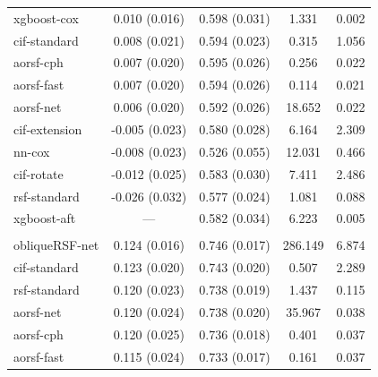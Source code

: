\documentclass{article}\usepackage[]{graphicx}\usepackage[]{xcolor}
\newenvironment{knitrout}{}{} %
\begin{document}
\begin{knitrout}
\begin{longtable}[t]{lcccc}
\hspace{1em}xgboost-cox & 0.010 (0.016) & 0.598 (0.031) & 1.331 & 0.002\\
\hspace{1em}cif-standard & 0.008 (0.021) & 0.594 (0.023) & 0.315 & 1.056\\
\hspace{1em}aorsf-cph & 0.007 (0.020) & 0.595 (0.026) & 0.256 & 0.022\\
\hspace{1em}aorsf-fast & 0.007 (0.020) & 0.594 (0.026) & 0.114 & 0.021\\
\hspace{1em}aorsf-net & 0.006 (0.020) & 0.592 (0.026) & 18.652 & 0.022\\
\hspace{1em}cif-extension & -0.005 (0.023) & 0.580 (0.028) & 6.164 & 2.309\\
\hspace{1em}nn-cox & -0.008 (0.023) & 0.526 (0.055) & 12.031 & 0.466\\
\hspace{1em}cif-rotate & -0.012 (0.025) & 0.583 (0.030) & 7.411 & 2.486\\
\hspace{1em}rsf-standard & -0.026 (0.032) & 0.577 (0.024) & 1.081 & 0.088\\
\hspace{1em}xgboost-aft & --- & 0.582 (0.034) & 6.223 & 0.005\\
\addlinespace[0.3em]
\multicolumn{5}{l}{\textit{\textbf{GBSG II; recurrence or death, n = 686, p = 10}}}\\
\hline
\hspace{1em}obliqueRSF-net & 0.124 (0.016) & 0.746 (0.017) & 286.149 & 6.874\\
\hspace{1em}cif-standard & 0.123 (0.020) & 0.743 (0.020) & 0.507 & 2.289\\
\hspace{1em}rsf-standard & 0.120 (0.023) & 0.738 (0.019) & 1.437 & 0.115\\
\hspace{1em}aorsf-net & 0.120 (0.024) & 0.738 (0.020) & 35.967 & 0.038\\
\hspace{1em}aorsf-cph & 0.120 (0.025) & 0.736 (0.018) & 0.401 & 0.037\\
\hspace{1em}aorsf-fast & 0.115 (0.024) & 0.733 (0.017) & 0.161 & 0.037\\

\end{longtable}
\end{knitrout}
\end{document}
